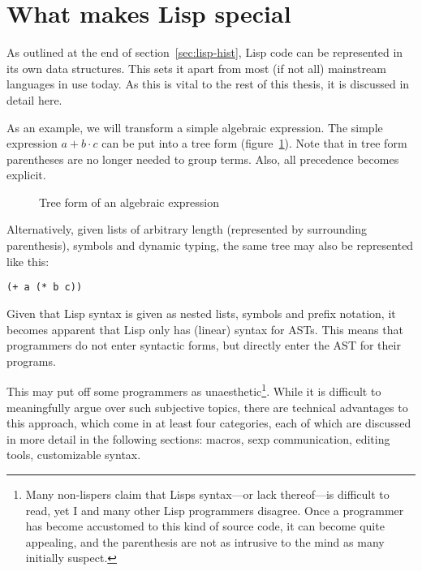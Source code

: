 \documentclass[a4paper,10pt,twoside]{report}
\begin{document}
\section{What makes Lisp special}
\label{sec:lisp-special}

As outlined at the end of section~\ref{sec:lisp-hist}, Lisp code can be
represented in its own data structures.  This sets it apart from most (if not
all) mainstream languages in use today. As this is vital to the rest of this
thesis, it is discussed in detail here.

As an example, we will transform a simple algebraic expression.  The simple
expression \(a + b \cdot c\) can be put into a tree form
(figure~\ref{fig:simple-tree}).  Note that in tree form parentheses are no
longer needed to group terms.  Also, all precedence becomes explicit.

\begin{figure}[h]
  \centering
  
  \caption{Tree form of an algebraic expression}
  \label{fig:simple-tree}
\end{figure}

Alternatively, given lists of arbitrary length (represented by surrounding
parenthesis), symbols and dynamic typing, the same tree may also be represented
like this:


\begin{lstlisting}[style=lispinline]
(+ a (* b c))
\end{lstlisting}

Given that Lisp syntax is given as nested lists, symbols and prefix notation, it
becomes apparent that Lisp only has (linear) syntax for ASTs.  This means that
programmers do not enter syntactic forms, but directly enter the AST for their
programs.

This may put off some programmers as unaesthetic\footnote{Many non-lispers claim
  that Lisps syntax---or lack thereof---is difficult to read, yet I and many
  other Lisp programmers disagree.  Once a programmer has become accustomed to
  this kind of source code, it can become quite appealing, and the parenthesis
  are not as intrusive to the mind as many initially suspect.}.  While it is
difficult to meaningfully argue over such subjective topics, there are technical
advantages to this approach, which come in at least four categories, each of
which are discussed in more detail in the following sections: macros, sexp
communication, editing tools, customizable syntax.
\end{document}
